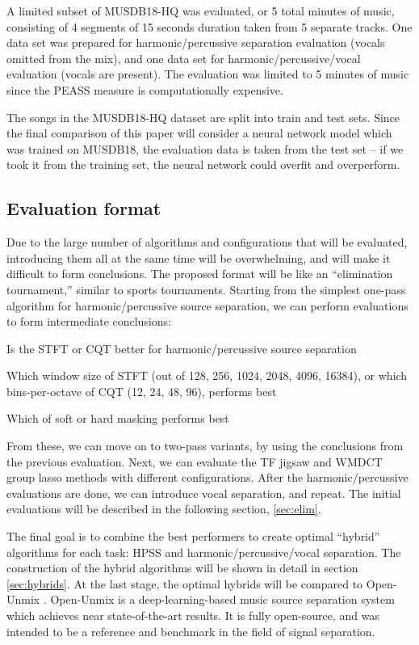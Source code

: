 \documentclass[letter,12pt]{article}
\newenvironment{tight_itemize}{
\begin{itemize}
  \setlength{\itemsep}{0pt}
  \setlength{\parskip}{0pt}
}{\end{itemize}}
\begin{document}
A limited subset of MUSDB18-HQ was evaluated, or 5 total minutes of music, consisting of 4 segments of 15 seconds duration taken from 5 separate tracks. One data set was prepared for harmonic/percussive separation evaluation (vocals omitted from the mix), and one data set for harmonic/percussive/vocal evaluation (vocals are present). The evaluation was limited to 5 minutes of music since the PEASS measure is computationally expensive.

The songs in the MUSDB18-HQ dataset are split into train and test sets. Since the final comparison of this paper will consider a neural network model which was trained on MUSDB18, the evaluation data is taken from the test set -- if we took it from the training set, the neural network could overfit and overperform.

\subsection{Evaluation format}

Due to the large number of algorithms and configurations that will be evaluated, introducing them all at the same time will be overwhelming, and will make it difficult to form conclusions. The proposed format will be like an ``elimination tournament,'' similar to sports tournaments. Starting from the simplest one-pass algorithm for harmonic/percussive source separation, we can perform evaluations to form intermediate conclusions:

\begin{tight_itemize}
\item
	Is the STFT or CQT better for harmonic/percussive source separation
\item
	Which window size of STFT (out of 128, 256, 1024, 2048, 4096, 16384), or which bins-per-octave of CQT (12, 24, 48, 96), performs best
\item
	Which of soft or hard masking performs best
\end{tight_itemize} 

From these, we can move on to two-pass variants, by using the conclusions from the previous evaluation. Next, we can evaluate the TF jigsaw and WMDCT group lasso methods with different configurations. After the harmonic/percussive evaluations are done, we can introduce vocal separation, and repeat. The initial evaluations will be described in the following section, \ref{sec:elim}.

The final goal is to combine the best performers to create optimal ``hybrid'' algorithms for each task: HPSS and harmonic/percussive/vocal separation. The construction of the hybrid algorithms will be shown in detail in section \ref{sec:hybrids}. At the last stage, the optimal hybrids will be compared to Open-Unmix \cite{umx}. Open-Unmix is a deep-learning-based music source separation system which achieves near state-of-the-art results. It is fully open-source, and was intended to be a reference and benchmark in the field of signal separation.
\end{document}
